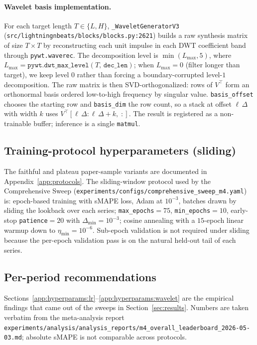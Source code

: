 \documentclass[11pt,a4paper]{article}
\begin{document}
\paragraph{Wavelet basis implementation.} For each target length $T \in \{L, H\}$, \texttt{\_WaveletGeneratorV3} (\texttt{src/lightningnbeats/blocks/blocks.py:2621}) builds a raw synthesis matrix of size $T \times T$ by reconstructing each unit impulse in each DWT coefficient band through \texttt{pywt.waverec}. The decomposition level is $\min(L_{\max}, 5)$, where $L_{\max}=\texttt{pywt.dwt\_max\_level}(T,\,\texttt{dec\_len})$; when $L_{\max}=0$ (filter longer than target), we keep level $0$ rather than forcing a boundary-corrupted level-$1$ decomposition. The raw matrix is then SVD-orthogonalized: rows of $V^\top$ form an orthonormal basis ordered low-to-high frequency by singular value. \texttt{basis\_offset} chooses the starting row and \texttt{basis\_dim} the row count, so a stack at offset $\ell\,\Delta$ with width $k$ uses $V^\top[\ell\,\Delta:\ell\,\Delta+k,\;:]$. The result is registered as a non-trainable buffer; inference is a single \texttt{matmul}.

\subsection{Training-protocol hyperparameters (sliding)}
\label{app:hyperparams:sliding}

The faithful and plateau paper-sample variants are documented in Appendix~\ref{app:protocols}. The sliding-window protocol used by the Comprehensive Sweep (\texttt{experiments/configs/comprehensive\_sweep\_m4.yaml}) is: epoch-based training with sMAPE loss, Adam at $10^{-3}$, batches drawn by sliding the lookback over each series; \texttt{max\_epochs}$=75$, \texttt{min\_epochs}$=10$, early-stop \texttt{patience}$=20$ with $\Delta_{\min}=10^{-3}$; cosine annealing with a $15$-epoch linear warmup down to $\eta_{\min}=10^{-6}$. Sub-epoch validation is not required under sliding because the per-epoch validation pass is on the natural held-out tail of each series.

\subsection{Per-period recommendations}
\label{app:hyperparams:perperiod}

Sections~\ref{app:hyperparams:lr}--\ref{app:hyperparams:wavelet} are the empirical findings that came out of the sweeps in Section~\ref{sec:results}. Numbers are taken verbatim from the meta-analysis report \texttt{experiments/analysis/analysis\_reports/m4\_overall\_leaderboard\_2026-05-03.md}; absolute sMAPE is not comparable across protocols.
\end{document}
